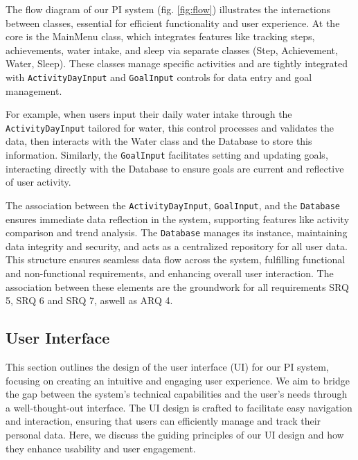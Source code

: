 \documentclass[12pt]{article}
\begin{document}
The flow diagram of our PI system (fig. \ref{fig:flow}) illustrates the
interactions between classes, essential for efficient functionality and user
experience. At the core is the MainMenu class, which integrates features like
tracking steps, achievements, water intake, and sleep via separate classes
(Step, Achievement, Water, Sleep). These classes manage specific activities and
are tightly integrated with \texttt{ActivityDayInput} and \texttt{GoalInput} controls for data
entry and goal management.\par

For example, when users input their daily water intake through the
\texttt{ActivityDayInput} tailored for water, this control processes and validates the
data, then interacts with the Water class and the Database to store this
information. Similarly, the \texttt{GoalInput} facilitates setting and updating goals,
interacting directly with the Database to ensure goals are current and
reflective of user activity.\par

The association between the \texttt{ActivityDayInput}, \texttt{GoalInput}, and the \texttt{Database}
ensures immediate data reflection in the system, supporting features like
activity comparison and trend analysis. The \texttt{Database} manages its instance,
maintaining data integrity and security, and acts as a centralized repository
for all user data. This structure ensures seamless data flow across the system,
fulfilling functional and non-functional requirements, and enhancing overall
user interaction. The association between these elements are the groundwork for all requirements SRQ 5, SRQ 6 and SRQ 7, aswell as ARQ 4.\par

\subsection{User Interface}

This section outlines the design of the user interface (UI) for our PI system,
focusing on creating an intuitive and engaging user experience. We aim to bridge
the gap between the system's technical capabilities and the user's needs through
a well-thought-out interface. The UI design is crafted to facilitate easy
navigation and interaction, ensuring that users can efficiently manage and track
their personal data. Here, we discuss the guiding principles of our UI design and
how they enhance usability and user engagement.\par
\end{document}
